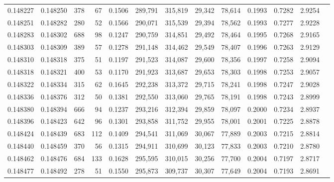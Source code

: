 \begin{tabular}{rrrrrrrrrrrrr}
0.148227 & 0.148250 &   378 &  67 &                                     0.1506 & 289,791 & 315,819 &  29,342 &  78,614 & 0.1993 & 0.7282 & 2.9254 \\
0.148251 & 0.148282 &   280 &  52 &                                     0.1566 & 290,071 & 315,539 &  29,394 &  78,562 & 0.1993 & 0.7277 & 2.9228 \\
0.148283 & 0.148302 &   688 &  98 &                                     0.1247 & 290,759 & 314,851 &  29,492 &  78,464 & 0.1995 & 0.7268 & 2.9165 \\
0.148303 & 0.148309 &   389 &  57 &                                     0.1278 & 291,148 & 314,462 &  29,549 &  78,407 & 0.1996 & 0.7263 & 2.9129 \\
0.148310 & 0.148318 &   375 &  51 &                                     0.1197 & 291,523 & 314,087 &  29,600 &  78,356 & 0.1997 & 0.7258 & 2.9094 \\
0.148318 & 0.148321 &   400 &  53 &                                     0.1170 & 291,923 & 313,687 &  29,653 &  78,303 & 0.1998 & 0.7253 & 2.9057 \\
0.148322 & 0.148334 &   315 &  62 &                                     0.1645 & 292,238 & 313,372 &  29,715 &  78,241 & 0.1998 & 0.7247 & 2.9028 \\
0.148336 & 0.148376 &   312 &  50 &                                     0.1381 & 292,550 & 313,060 &  29,765 &  78,191 & 0.1998 & 0.7243 & 2.8999 \\
0.148380 & 0.148394 &   666 &  94 &                                     0.1237 & 293,216 & 312,394 &  29,859 &  78,097 & 0.2000 & 0.7234 & 2.8937 \\
0.148396 & 0.148423 &   642 &  96 &                                     0.1301 & 293,858 & 311,752 &  29,955 &  78,001 & 0.2001 & 0.7225 & 2.8878 \\
0.148424 & 0.148439 &   683 & 112 &                                     0.1409 & 294,541 & 311,069 &  30,067 &  77,889 & 0.2003 & 0.7215 & 2.8814 \\
0.148440 & 0.148459 &   370 &  56 &                                     0.1315 & 294,911 & 310,699 &  30,123 &  77,833 & 0.2003 & 0.7210 & 2.8780 \\
0.148462 & 0.148476 &   684 & 133 &                                     0.1628 & 295,595 & 310,015 &  30,256 &  77,700 & 0.2004 & 0.7197 & 2.8717 \\
0.148477 & 0.148492 &   278 &  51 &                                     0.1550 & 295,873 & 309,737 &  30,307 &  77,649 & 0.2004 & 0.7193 & 2.8691 \\

\end{tabular}
